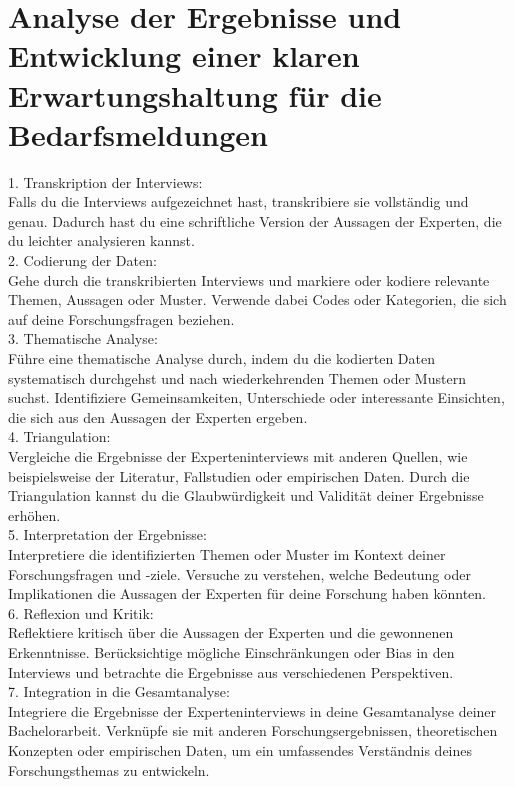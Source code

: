 \section{Analyse der Ergebnisse und Entwicklung einer klaren Erwartungshaltung für die Bedarfsmeldungen}

1. Transkription der Interviews:\\
Falls du die Interviews aufgezeichnet hast, transkribiere sie vollständig und genau. Dadurch hast du eine schriftliche Version der Aussagen der Experten, die du leichter analysieren kannst.\\

2. Codierung der Daten:\\
Gehe durch die transkribierten Interviews und markiere oder kodiere relevante Themen, Aussagen oder Muster. Verwende dabei Codes oder Kategorien, die sich auf deine Forschungsfragen beziehen.\\

3. Thematische Analyse:\\
Führe eine thematische Analyse durch, indem du die kodierten Daten systematisch durchgehst und nach wiederkehrenden Themen oder Mustern suchst. Identifiziere Gemeinsamkeiten, Unterschiede oder interessante Einsichten, die sich aus den Aussagen der Experten ergeben.\\

4. Triangulation:\\
Vergleiche die Ergebnisse der Experteninterviews mit anderen Quellen, wie beispielsweise der Literatur, Fallstudien oder empirischen Daten. Durch die Triangulation kannst du die Glaubwürdigkeit und Validität deiner Ergebnisse erhöhen.\\

5. Interpretation der Ergebnisse:\\
Interpretiere die identifizierten Themen oder Muster im Kontext deiner Forschungsfragen und -ziele. Versuche zu verstehen, welche Bedeutung oder Implikationen die Aussagen der Experten für deine Forschung haben könnten.\\

6. Reflexion und Kritik:\\
Reflektiere kritisch über die Aussagen der Experten und die gewonnenen Erkenntnisse. Berücksichtige mögliche Einschränkungen oder Bias in den Interviews und betrachte die Ergebnisse aus verschiedenen Perspektiven.\\

7. Integration in die Gesamtanalyse:\\
Integriere die Ergebnisse der Experteninterviews in deine Gesamtanalyse deiner Bachelorarbeit. Verknüpfe sie mit anderen Forschungsergebnissen, theoretischen Konzepten oder empirischen Daten, um ein umfassendes Verständnis deines Forschungsthemas zu entwickeln.\\

